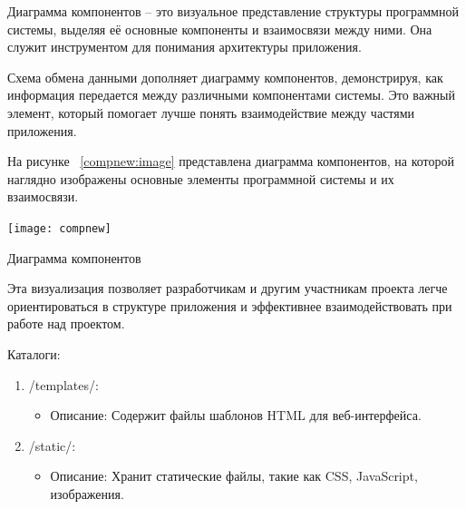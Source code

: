 Диаграмма компонентов – это визуальное представление структуры программной системы, выделяя её основные компоненты и взаимосвязи между ними. Она служит инструментом для понимания архитектуры приложения.

Схема обмена данными дополняет диаграмму компонентов, демонстрируя, как информация передается между различными компонентами системы. Это важный элемент, который помогает лучше понять взаимодействие между частями приложения.

На рисунке ~\ref{compnew:image} представлена диаграмма компонентов, на которой наглядно изображены основные элементы программной системы и их взаимосвязи. 



\begin{landscape}
	
	\begin{плакат}
		\texttt{[image: compnew]}
		\caption{Диаграмма компонентов}
		\label{compnew:image}      
	\end{плакат}
\end{landscape}

Эта визуализация позволяет разработчикам и другим участникам проекта легче ориентироваться в структуре приложения и эффективнее взаимодействовать при работе над проектом.

Каталоги:
\begin{enumerate}
\item /templates/:
\begin{itemize}
\item Описание: Содержит файлы шаблонов HTML для веб-интерфейса.
\end{itemize}

\item /static/:
\begin{itemize}
\item Описание: Хранит статические файлы, такие как CSS, JavaScript, изображения.
\end{itemize}

\end{enumerate}


